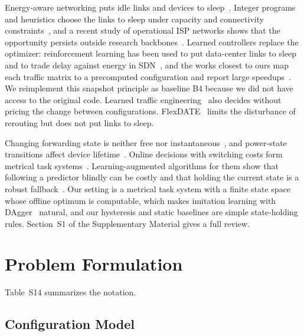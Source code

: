 \documentclass[5p,times]{elsarticle}
\begin{document}
Energy-aware networking puts idle links and devices to sleep~\cite{bianzino2012survey,bolla2011energy}. Integer programs and heuristics choose the links to sleep under capacity and connectivity constraints~\cite{chiaraviglio2012minimizing,zhang2010greente,heller2010elastictree}, and a recent study of operational ISP networks shows that the opportunity persists outside research backbones~\cite{rollin2024sleep}. Learned controllers replace the optimizer: reinforcement learning has been used to put data-center links to sleep~\cite{wang2022dcndrl} and to trade delay against energy in SDN~\cite{frohlich2021rl}, and the works closest to ours map each traffic matrix to a precomputed configuration and report large speedups~\cite{gomezdelahiz2025noms,gomezdelahiz2026tgcn}. We reimplement this snapshot principle as baseline B4 because we did not have access to the original code. Learned traffic engineering~\cite{xu2023teal,perry2023dote,almasan2022enero} also decides without pricing the change between configurations. FlexDATE~\cite{ye2023flexdate} limits the disturbance of rerouting but does not put links to sleep.

Changing forwarding state is neither free nor instantaneous~\cite{reitblatt2012abstractions,jin2014dionysus}, and power-state transitions affect device lifetime~\cite{chiaraviglio2015lifetime}. Online decisions with switching costs form metrical task systems~\cite{borodin1992mts}. Learning-augmented algorithms for them show that following a predictor blindly can be costly and that holding the current state is a robust fallback~\cite{antoniadis2023mts,christianson2023dart}. Our setting is a metrical task system with a finite state space whose offline optimum is computable, which makes imitation learning with DAgger~\cite{ross2011dagger} natural, and our hysteresis and static baselines are simple state-holding rules. Section~S1 of the Supplementary Material gives a full review.

\section{Problem Formulation}\label{sec:problem}

Table~S14 summarizes the notation.


\subsection{Configuration Model}
\end{document}
